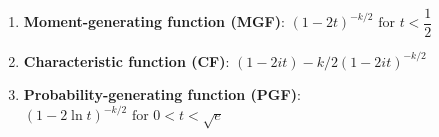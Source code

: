 \begin{enumerate}


    \item \textbf{Moment-generating function (MGF)}: $  {\displaystyle (1-2t)^{-k/2}{\text{ for }}t<{\dfrac {1}{2}}\;} $
    \hfill \cite{wiki/Chi-squared_distribution}

    \item \textbf{Characteristic function (CF)}:
    $  ( 1 - 2 i t ) - k / 2 {\displaystyle (1-2it)^{-k/2}} $
    \hfill \cite{wiki/Chi-squared_distribution}

    \item \textbf{Probability-generating function (PGF)}: $  {\displaystyle (1-2\ln t)^{-k/2}{\text{ for }}0<t<{\sqrt {e}}\;} $
    \hfill \cite{wiki/Chi-squared_distribution}


\end{enumerate}











